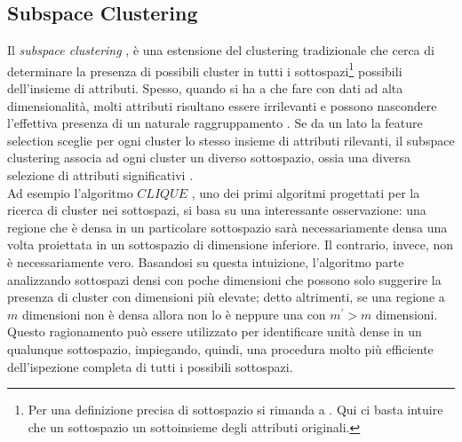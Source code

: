 \subsection{Subspace Clustering}
\label{subsec:subspace_clustering}
Il \textit{subspace clustering} \cite{Parsons2004},\cite{Moise2009} \`e una estensione del clustering tradizionale che cerca di determinare la presenza di possibili cluster in tutti i sottospazi\footnote{Per una definizione precisa di sottospazio si rimanda a \cite{Vidal}. Qui ci basta intuire che un sottospazio un sottoinsieme degli attributi originali.} possibili dell'insieme di attributi.
Spesso, quando si ha a che fare con dati ad alta dimensionalit\`a, molti attributi risultano essere irrilevanti e possono nascondere l'effettiva presenza di un naturale raggruppamento \cite{Steinbach03}. Se da un lato la feature selection sceglie per ogni cluster lo stesso insieme di attributi rilevanti, il subspace clustering associa ad ogni cluster un diverso sottospazio, ossia una diversa selezione di attributi significativi \cite{Parsons2004}.\\
Ad esempio l'algoritmo $ CLIQUE $ \cite{clique}, uno dei primi algoritmi progettati per la ricerca di cluster nei sottospazi, si basa su una interessante osservazione: una regione che \`e densa in un particolare sottospazio sar\`a necessariamente densa una volta proiettata in un sottospazio di dimensione inferiore. Il contrario, invece, non \`e necessariamente vero. Basandosi su questa intuizione, l'algoritmo parte analizzando sottospazi densi con poche dimensioni che possono solo suggerire la presenza di cluster con dimensioni pi\`u elevate; detto altrimenti, se una regione a $ m $ dimensioni non \`e densa allora non lo \`e neppure una con $ m^{'} > m $ dimensioni.
Questo ragionamento  pu\`o essere utilizzato per identificare unit\`a dense in un qualunque sottospazio, impiegando, quindi, una procedura molto pi\`u efficiente dell'ispezione completa di tutti i possibili sottospazi. 
